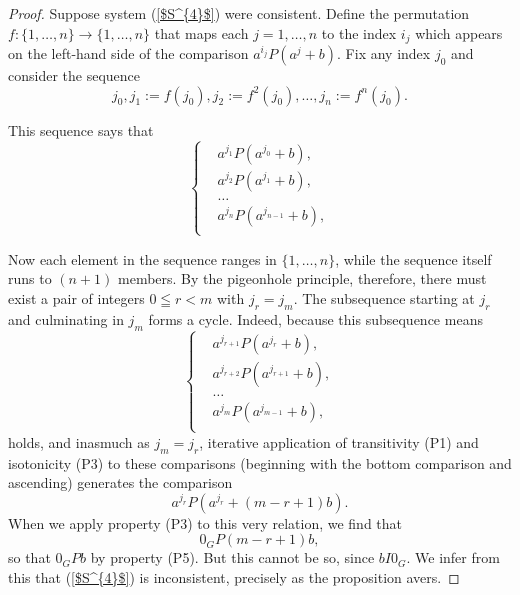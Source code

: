 \documentclass[pdflatex,sn-apa,11pt]{sn-jnl}%
\begin{document}
\begin{proof}
Suppose system (\ref{$S^{4}$}) were consistent. Define the permutation $f:\{1, \dots, n\} \rightarrow \{1, \dots, n\}$ that maps each $j = 1, \dots, n$ to the index $i_j$ which appears on the left-hand side of the comparison $a^{i_j}P(a^{j}+b)$. Fix any index $j_0$ and consider the sequence \begin{equation*}j_0, j_1 := f(j_0), j_2 := f^2(j_0), \dots, j_n:= f^{n}(j_0).\end{equation*}

This sequence says that \begin{equation*}
  \left\{
    \begin{aligned}
      & a^{j_{1}}P(a^{j_0} + b), \\
      & a^{j_{2}}P(a^{j_{1}}+b), \\
      & \dots \\
      & a^{j_n}P(a^{j_{n-1}} + b), \\
    \end{aligned}
  \right.
\end{equation*} 

Now each element in the sequence ranges in $\{1, \dots, n\}$, while the sequence itself runs to $(n+1)$ members. By the pigeonhole principle, therefore, there must exist a pair of integers $0 \leqq r < m$ with $j_r = j_m$. The subsequence starting at $j_r$ and culminating in $j_m$ forms a cycle. Indeed, because this subsequence means \begin{equation*}
  \left\{
    \begin{aligned}
      & a^{j_{r+1}}P(a^{j_r} + b), \\
      & a^{j_{r+2}}P(a^{j_{r+1}}+b), \\
      & \dots \\
      & a^{j_m}P(a^{j_{m-1}} + b), \\
    \end{aligned}
  \right.
\end{equation*}
holds, and inasmuch as $j_m = j_r$, iterative application of transitivity (P1) and isotonicity (P3) to these comparisons (beginning with the bottom comparison and ascending) generates the comparison \begin{equation*}a^{j_r}P(a^{j_r}+(m-r+1)b).\end{equation*} When we apply property (P3) to this very relation, we find that \begin{equation*}0_GP(m-r+1)b,\end{equation*}
so that $0_GPb$ by property (P5). But this cannot be so, since $bI0_{G}$. We infer from this that (\ref{$S^{4}$}) is inconsistent, precisely as the proposition avers. 


\end{proof}
\end{document}
